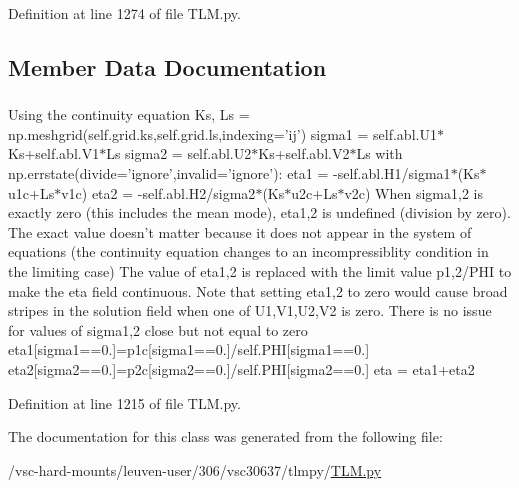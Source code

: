 Definition at line 1274 of file TLM.py.

\subsection{Member Data Documentation}
\hypertarget{classtlmpy_1_1TLM_1_1S2Dmodel_a60e690b8ace47a52e50485876d046348}{
\subsubsection[{PHI}]{}}
\label{classtlmpy_1_1TLM_1_1S2Dmodel_a60e690b8ace47a52e50485876d046348}


Using the continuity equation Ks, Ls = np.meshgrid(self.grid.ks,self.grid.ls,indexing='ij') sigma1 = self.abl.U1$\ast$Ks+self.abl.V1$\ast$Ls sigma2 = self.abl.U2$\ast$Ks+self.abl.V2$\ast$Ls with np.errstate(divide='ignore',invalid='ignore'): eta1 = -\/self.abl.H1/sigma1$\ast$(Ks$\ast$u1c+Ls$\ast$v1c) eta2 = -\/self.abl.H2/sigma2$\ast$(Ks$\ast$u2c+Ls$\ast$v2c) When sigma1,2 is exactly zero (this includes the mean mode), eta1,2 is undefined (division by zero). The exact value doesn't matter because it does not appear in the system of equations (the continuity equation changes to an incompressiblity condition in the limiting case) The value of eta1,2 is replaced with the limit value p1,2/PHI to make the eta field continuous. Note that setting eta1,2 to zero would cause broad stripes in the solution field when one of U1,V1,U2,V2 is zero. There is no issue for values of sigma1,2 close but not equal to zero eta1\mbox{[}sigma1==0.\mbox{]}=p1c\mbox{[}sigma1==0.\mbox{]}/self.PHI\mbox{[}sigma1==0.\mbox{]} eta2\mbox{[}sigma2==0.\mbox{]}=p2c\mbox{[}sigma2==0.\mbox{]}/self.PHI\mbox{[}sigma2==0.\mbox{]} eta = eta1+eta2 

Definition at line 1215 of file TLM.py.

The documentation for this class was generated from the following file:\begin{DoxyCompactItemize}
\item 
/vsc-\/hard-\/mounts/leuven-\/user/306/vsc30637/tlmpy/\hyperlink{TLM_8py}{TLM.py}\end{DoxyCompactItemize}
